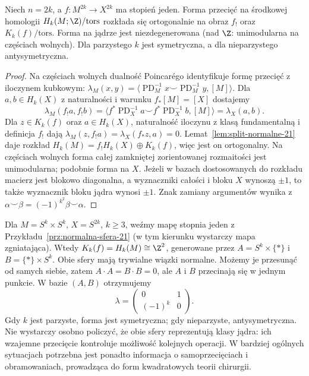 \begin{stwierdzenie}
\label{prop:forma-jadra-21}
Niech $n=2k$, a $f:M^{2k}\to X^{2k}$ ma stopień
jeden. Forma przecięć na środkowej homologii
$H_k(M;\Z)/\mathrm{tors}$ rozkłada się ortogonalnie
na obraz $f_!$ oraz $K_k(f)/\mathrm{tors}$.
Forma na jądrze jest niezdegenerowana
(nad $\Z$: unimodularna na częściach wolnych).
Dla parzystego $k$ jest symetryczna, a dla
nieparzystego antysymetryczna.
\end{stwierdzenie}
\begin{proof}
Na częściach wolnych dualność Poincarégo
identyfikuje formę przecięć z iloczynem kubkowym:
$\lambda_M(x,y)=\langle\operatorname{PD}_M^{-1}x
\smile\operatorname{PD}_M^{-1}y,[M]\rangle$.
Dla $a,b\in H_k(X)$ z naturalności i warunku
$f_*[M]=[X]$ dostajemy
\[
 \lambda_M(f_!a,f_!b)
 =\langle f^*\operatorname{PD}_X^{-1}a
 \smile f^*\operatorname{PD}_X^{-1}b,[M]\rangle
 =\lambda_X(a,b).
\]
Dla $z\in K_k(f)$ oraz $a\in H_k(X)$,
naturalność iloczynu z klasą fundamentalną
i definicja $f_!$ dają
$\lambda_M(z,f_!a)=\lambda_X(f_*z,a)=0$.
Lemat~\ref{lem:split-normalne-21} daje rozkład
$H_k(M)=f_!H_k(X)\oplus K_k(f)$, więc jest
on ortogonalny. Na częściach wolnych forma
całej zamkniętej zorientowanej rozmaitości
jest unimodularna; podobnie forma na $X$.
Jeżeli w bazach dostosowanych do rozkładu
macierz jest blokowo diagonalna, a wyznaczniki
całości i bloku $X$ wynoszą $\pm1$, to także
wyznacznik bloku jądra wynosi $\pm1$.
Znak zamiany argumentów wynika z
$\alpha\smile\beta=(-1)^{k^2}\beta\smile\alpha$.
\end{proof}

\begin{przyklad}
\label{prz:forma-produkt-21}
Dla $M=S^k\times S^k$, $X=S^{2k}$, $k\geq3$,
weźmy mapę stopnia jeden z
Przykładu~\ref{prz:normalna-sfera-21}
(w tym kierunku wystarczy mapa zgniatająca).
Wtedy $K_k(f)=H_k(M)\cong\Z^2$,
generowane przez
$A=S^k\times\{*\}$ i $B=\{*\}\times S^k$.
Obie sfery mają trywialne wiązki normalne.
Możemy je przesunąć od samych siebie, zatem
$A\cdot A=B\cdot B=0$, ale $A$ i $B$
przecinają się w jednym punkcie.
W bazie $(A,B)$ otrzymujemy
\[
 \lambda=\begin{pmatrix}0&1\\(-1)^k&0\end{pmatrix}.
\]
Gdy $k$ jest parzyste, forma jest symetryczna;
gdy nieparzyste, antysymetryczna.
Nie wystarczy osobno policzyć, że obie sfery
reprezentują klasy jądra: ich wzajemne
przecięcie kontroluje możliwość kolejnych
operacji. W bardziej ogólnych sytuacjach
potrzebna jest ponadto informacja o
samoprzecięciach i obramowaniach, prowadząca
do form kwadratowych teorii chirurgii.
\end{przyklad}

